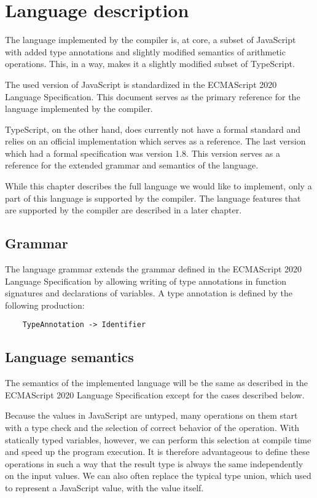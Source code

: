 \chapter{Language description}\label{language}

The language implemented by the compiler is, at core, a subset of JavaScript with added type annotations and slightly modified semantics of arithmetic operations. This, in a way, makes it a slightly modified subset of TypeScript.

The used version of JavaScript is standardized in the ECMAScript 2020 Language Specification\cite{ecma262}. This document serves as the primary reference for the language implemented by the compiler.

TypeScript, on the other hand, does currently not have a formal standard and relies on an official implementation which serves as a reference. The last version which had a formal specification was version 1.8\cite{typescript18}. This version serves as a reference for the extended grammar and semantics of the language.

While this chapter describes the full language we would like to implement, only a part of this language is supported by the compiler. The language features that are supported by the compiler are described in a later chapter.

\section{Grammar}

The language grammar extends the grammar defined in the ECMAScript 2020 Language Specification\cite{ecma262} by allowing writing of type annotations in function signatures and declarations of variables. A type annotation is defined by the following production:

\begin{verbatim}
    TypeAnnotation -> Identifier
\end{verbatim}


\section{Language semantics}

The semantics of the implemented language will be the same as described in the ECMAScript 2020 Language Specification\cite{ecma262} except for the cases described below.

Because the values in JavaScript are untyped, many operations on them start with a type check and the selection of correct behavior of the operation. With statically typed variables, however, we can perform this selection at compile time and speed up the program execution. It is therefore advantageous to define these operations in such a way that the result type is always the same independently on the input values. We can also often replace the typical type union, which used to represent a JavaScript value, with the value itself.

